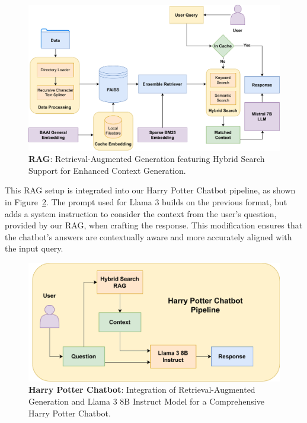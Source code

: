 \documentclass[fleqn,moreauthors,10pt]{ds_report}
\begin{document}
    \begin{figure}[!htb]
            \centering 
    	\includegraphics[width=\linewidth]{fig/rag.drawio.pdf}
    	\caption{\textbf{RAG}: Retrieval-Augmented Generation featuring Hybrid Search Support for Enhanced Context Generation.}
    	\label{fig:rag}
    \end{figure}

    This RAG setup is integrated into our Harry Potter Chatbot pipeline, as shown in Figure~\ref{fig:rag_and_llama}. The prompt used for Llama 3 builds on the previous format, but adds a system instruction to consider the context from the user's question, provided by our RAG, when crafting the response. This modification ensures that the chatbot's answers are contextually aware and more accurately aligned with the input query.

    \begin{figure}[!htb]
            \centering 
    	\includegraphics[width=\linewidth]{fig/rag_and_llama.drawio.pdf}
    	\caption{\textbf{Harry Potter Chatbot}: Integration of Retrieval-Augmented Generation and Llama 3 8B Instruct Model for a Comprehensive Harry Potter Chatbot.}
    	\label{fig:rag_and_llama}
    \end{figure}
\end{document}

